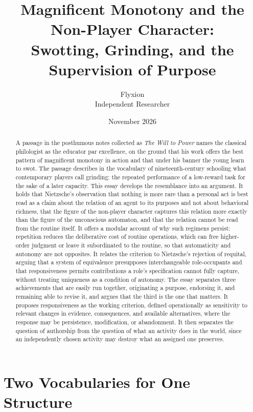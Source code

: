 \documentclass[11pt]{article}
\title{Magnificent Monotony and the Non-Player Character:\\Swotting, Grinding, and the Supervision of Purpose}
\author{Flyxion\\Independent Researcher}
\date{November 2026}
\begin{document}
\maketitle

\begin{abstract}
\noindent A passage in the posthumous notes collected as \emph{The Will to Power} names the classical philologist as the educator par excellence, on the ground that his work offers the best pattern of magnificent monotony in action and that under his banner the young learn to swot. The passage describes in the vocabulary of nineteenth-century schooling what contemporary players call grinding: the repeated performance of a low-reward task for the sake of a later capacity. This essay develops the resemblance into an argument. It holds that Nietzsche's observation that nothing is more rare than a personal act is best read as a claim about the relation of an agent to its purposes and not about behavioral richness, that the figure of the non-player character captures this relation more exactly than the figure of the unconscious automaton, and that the relation cannot be read from the routine itself. It offers a modular account of why such regimens persist: repetition reduces the deliberative cost of routine operations, which can free higher-order judgment or leave it subordinated to the routine, so that automaticity and autonomy are not opposites. It relates the criterion to Nietzsche's rejection of requital, arguing that a system of equivalence presupposes interchangeable role-occupants and that responsiveness permits contributions a role's specification cannot fully capture, without treating uniqueness as a condition of autonomy. The essay separates three achievements that are easily run together, originating a purpose, endorsing it, and remaining able to revise it, and argues that the third is the one that matters. It proposes responsiveness as the working criterion, defined operationally as sensitivity to relevant changes in evidence, consequences, and available alternatives, where the response may be persistence, modification, or abandonment. It then separates the question of authorship from the question of what an activity does in the world, since an independently chosen activity may destroy what an assigned one preserves.
\end{abstract}

\newpage
\section{Two Vocabularies for One Structure}
\end{document}
